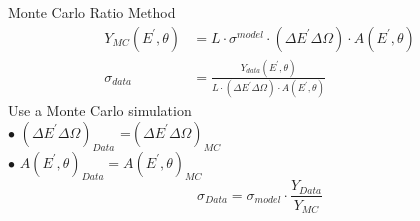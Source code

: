 \documentclass[12pt,usenames,dvipsnames]{beamer}
\begin{document}
\begin{frame}
	\begin{block}{Monte Carlo Ratio Method}
	\begin{align}
		Y_{MC}(E^{\prime},\theta) &= L \cdot \sigma^{model} \cdot (\Delta E^{\prime} \Delta \Omega) \cdot A(E^{\prime},\theta) \nonumber\\
		\sigma_{data} &= \frac{Y_{data}(E^{\prime},\theta)}{ L \cdot (\Delta E^{\prime} \Delta \Omega) \cdot A(E^{\prime},\theta) }\nonumber
	\end{align}
	Use a Monte Carlo simulation  \\
	$\bullet$ $(\Delta E^{\prime} \Delta \Omega)_{Data}$ =$(\Delta E^{\prime} \Delta \Omega)_{MC}$\\
	$\bullet$ $A(E^{\prime},\theta)_{Data} = A(E^{\prime},\theta)_{MC}$
	\begin{equation}
		\sigma_{Data} = \sigma_{model} \cdot \frac{Y_{Data}}{Y_{MC}}\nonumber
	\end{equation} 
	\end{block}
\end{frame}
\end{document}

